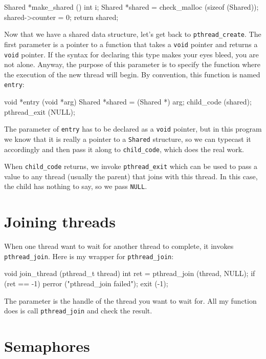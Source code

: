 \begin{lstbox}{}
Shared *make_shared ()
{
  int i;
  Shared *shared = check_malloc (sizeof (Shared));
  shared->counter = 0;
  return shared;
}
\end{lstbox}

Now that we have a shared data structure, let's get back to
{\tt pthread\_create}.
The first parameter is a pointer to a function that takes
a {\tt void} pointer and returns a {\tt void} pointer.  If the syntax
for declaring this type makes your eyes bleed, you are not alone.
Anyway, the purpose of this parameter is to specify the function where
the execution of the new thread will begin.  By convention, this
function is named {\tt entry}:

\begin{lstbox}{}
void *entry (void *arg)
{
  Shared *shared = (Shared *) arg;
  child_code (shared);
  pthread_exit (NULL);
}
\end{lstbox}

The parameter of {\tt entry} has to be declared as a {\tt void}
pointer, but in this program we know that it is really a pointer to a
{\tt Shared} structure, so we can typecast it accordingly and then
pass it along to {\tt child\_code}, which does the real work.

When {\tt child\_code} returns, we invoke {\tt pthread\_exit}
which can be used to pass a value to any thread (usually the
parent) that joins with this thread.  In this case, the child
has nothing to say, so we pass {\tt NULL}.


\section{Joining threads}

When one thread want to wait for another thread to complete,
it invokes {\tt pthread\_join}.
Here is my wrapper for {\tt pthread\_join}:

\begin{lstbox}{}
void join_thread (pthread_t thread)
{
  int ret = pthread_join (thread, NULL);
  if (ret == -1) {
    perror ("pthread_join failed");
    exit (-1);
  }
}
\end{lstbox}

The parameter is the handle of the thread you want to wait for.
All my function does is call {\tt pthread\_join} and check the
result.


\section{Semaphores}

